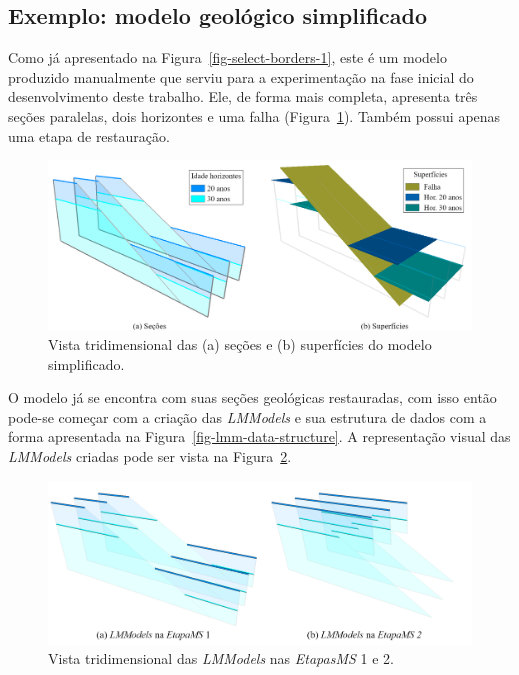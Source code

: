 \subsection{Exemplo: modelo geológico simplificado}

Como já apresentado na Figura~\ref{fig-select-borders-1}, este é um modelo produzido manualmente que serviu para a experimentação na fase inicial do desenvolvimento deste trabalho. Ele, de forma mais completa, apresenta três seções paralelas, dois horizontes e uma falha (Figura~\ref{fig-example-1-1}). Também possui apenas uma etapa de restauração. 

\begin{figure} [H]
  \begin{center}
    \includegraphics[width=\textwidth]{images/fig-example-1-1}
    \caption{Vista tridimensional das (a) seções e (b) superfícies do modelo simplificado.}\label{fig-example-1-1}
  \end{center}
\end{figure}

O modelo já se encontra com suas seções geológicas restauradas, com isso então pode-se começar com a criação das \textit{LMModels} e sua estrutura de dados com a forma apresentada na Figura~\ref{fig-lmm-data-structure}. A representação visual das \textit{LMModels} criadas pode ser vista na Figura~\ref{fig-example-1-2}.

\begin{figure} [h]
  \begin{center}
    \includegraphics[width=\textwidth]{images/fig-example-1-2}
    \caption{Vista tridimensional das \textit{LMModels} nas \textit{EtapasMS} 1 e 2.}\label{fig-example-1-2}
  \end{center}
\end{figure}


